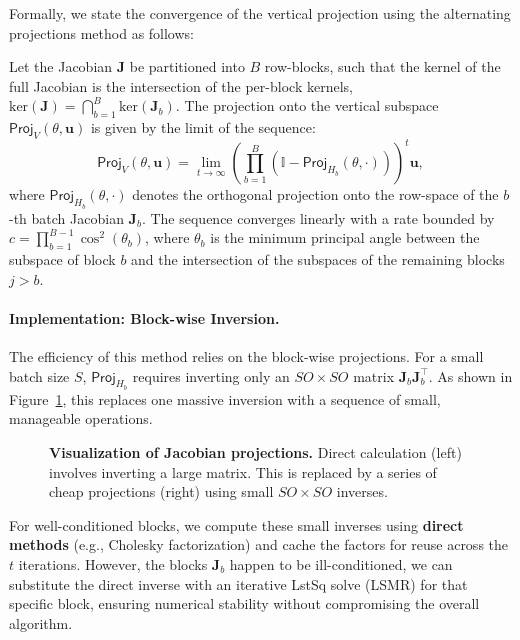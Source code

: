 Formally, we state the convergence of the vertical projection using the alternating projections method as follows:

\begin{theorem}
    \label{thm:altproj_convergence}
    Let the Jacobian $\mathbf{J}$ be partitioned into $B$ row-blocks, such that the kernel of the full Jacobian is the intersection of the per-block kernels, $\text{ker}(\mathbf{J}) = \bigcap_{b=1}^B \text{ker}(\mathbf{J}_b)$. The projection onto the vertical subspace $\textsf{Proj}_V(\theta, \mathbf{u})$ is given by the limit of the sequence:
    \begin{equation}
      \label{eq:altproj}
        \textsf{Proj}_V(\theta, \mathbf{u}) = \lim_{t\rightarrow\infty}
        \left(
          \prod_{b=1}^B
            \left(
                \mathbb{I} - \textsf{Proj}_{H_b}(\theta, \cdot)
            \right)
        \right)^t \mathbf{u},
    \end{equation}
    where $\textsf{Proj}_{H_b}(\theta, \cdot)$ denotes the orthogonal projection onto the row-space of the $b$-th batch Jacobian $\mathbf{J}_b$. The sequence converges linearly with a rate bounded by $c = \prod_{b=1}^{B-1} \cos^2(\theta_b)$, where $\theta_b$ is the minimum principal angle between the subspace of block $b$ and the intersection of the subspaces of the remaining blocks $j > b$.
\end{theorem}
\paragraph{Implementation: Block-wise Inversion.}
The efficiency of this method relies on the block-wise projections. For a small batch size $S$, $\textsf{Proj}_{H_b}$ requires inverting only an $SO \times SO$ matrix $\mathbf{J}_b \mathbf{J}_b^\top$. As shown in Figure~\ref{fig:projection_matrices}, this replaces one massive inversion with a sequence of small, manageable operations.


\begin{figure}[h]
    \centering
    \caption{\textbf{Visualization of Jacobian projections.} Direct calculation (left) involves inverting a large matrix. This is replaced by a series of cheap projections (right) using small $SO \times SO$ inverses.}
    \label{fig:projection_matrices}
\end{figure}

For well-conditioned blocks, we compute these small inverses using \textbf{direct methods} (e.g., Cholesky factorization) and cache the factors for reuse across the $t$ iterations. However, the blocks $\mathbf{J}_b$ happen to be ill-conditioned, we can substitute the direct inverse with an iterative \textsf{LstSq} solve (LSMR) for that specific block, ensuring numerical stability without compromising the overall algorithm.

